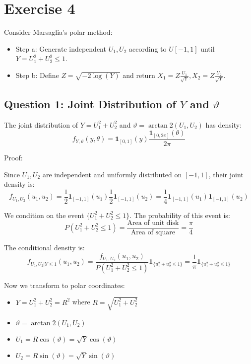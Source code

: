 \section*{Exercise 4}

Consider Marsaglia's polar method:

\begin{itemize}
    \item Step a: Generate independent $U_1, U_2$ according to $U[-1,1]$ until $Y = U_1^2 + U_2^2 \leq 1$.
    \item Step b: Define $Z = \sqrt{-2 \log(Y)}$ and return $X_1 = Z \frac{U_1}{\sqrt{Y}}, X_2 = Z \frac{U_2}{\sqrt{Y}}$.
\end{itemize}

\subsection*{Question 1: Joint Distribution of $Y$ and $\vartheta$}

The joint distribution of $Y = U_1^2 + U_2^2$ and $\vartheta = \arctan2(U_1, U_2)$ has density:
$$f_{Y,\vartheta}(y, \theta) = \mathbf{1}_{[0,1]}(y) \frac{\mathbf{1}_{[0,2\pi]}(\theta)}{2\pi}$$

Proof:

Since $U_1, U_2$ are independent and uniformly distributed on $[-1,1]$, their joint density is:
$$f_{U_1,U_2}(u_1, u_2) = \frac{1}{2} \mathbf{1}_{[-1,1]}(u_1) \frac{1}{2}\mathbf{1}_{[-1,1]}(u_2) =  \frac{1}{4} \mathbf{1}_{[-1,1]}(u_1) \mathbf{1}_{[-1,1]}(u_2)$$

We condition on the event $\{U_1^2 + U_2^2 \leq 1\}$. The probability of this event is:
$$P(U_1^2 + U_2^2 \leq 1) = \frac{\text{Area of unit disk}}{\text{Area of square}} = \frac{\pi}{4}$$

The conditional density is:
$$f_{U_1,U_2|Y \leq 1}(u_1, u_2) = \frac{f_{U_1,U_2}(u_1, u_2)}{P(U_1^2 + U_2^2 \leq 1)} \mathbf{1}_{\{u_1^2 + u_2^2 \leq 1\}} = \frac{1}{\pi} \mathbf{1}_{\{u_1^2 + u_2^2 \leq 1\}}$$

Now we transform to polar coordinates:
\begin{itemize}
    \item $Y = U_1^2 + U_2^2 = R^2$ where $R = \sqrt{U_1^2 + U_2^2}$
    \item $\vartheta = \arctan2(U_1, U_2)$
    \item $U_1 = R\cos(\vartheta) = \sqrt{Y}\cos(\vartheta)$
    \item $U_2 = R\sin(\vartheta) = \sqrt{Y}\sin(\vartheta)$
\end{itemize}

